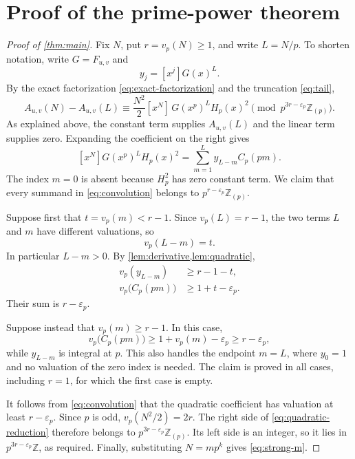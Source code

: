 \documentclass[11pt,a4paper]{article}
\numberwithin{equation}{section}
\theoremstyle{definition}
\theoremstyle{remark}
\newcommand{\Z}{\mathbb Z}
\newcommand{\Zp}{\Z_{(p)}}
\newcommand{\vp}{v_p}
\newcommand{\epsp}{\varepsilon_p}
\newcommand{\Auv}{A_{u,v}}
\newcommand{\Fp}{F_{u,v}}
\newcommand{\Hp}{H_p}
\newcommand{\Cp}{C_p}
\newcommand{\pmodring}[1]{\pmod{#1\Zp}}
\begin{document}
\section{Proof of the prime-power theorem}\label{sec:proof}

\begin{proof}[Proof of \cref{thm:main}]
Fix $N$, put $r=\vp(N)\geq1$, and write $L=N/p$. To shorten notation,
write $G=\Fp$ and
\[
 y_j=[x^j]G(x)^L.
\]
By the exact factorization \eqref{eq:exact-factorization} and the
truncation \eqref{eq:tail},
\begin{equation}\label{eq:quadratic-reduction}
 \Auv(N)-\Auv(L)
 \equiv\frac{N^2}{2}[x^N]\,G(x^p)^L\Hp(x)^2
 \pmodring{p^{3r-\epsp}}.
\end{equation}
As explained above, the constant term supplies $\Auv(L)$ and the linear
term supplies zero. Expanding the coefficient on the right gives
\begin{equation}\label{eq:convolution}
 [x^N]G(x^p)^L\Hp(x)^2
   =\sum_{m=1}^{L}y_{L-m}\Cp(pm).
\end{equation}
The index $m=0$ is absent because $\Hp^2$ has zero constant term.
We claim that every summand in \eqref{eq:convolution} belongs to
$p^{r-\epsp}\Zp$.

Suppose first that $t=\vp(m)<r-1$. Since $\vp(L)=r-1$, the two terms
$L$ and $m$ have different valuations, so
\[
 \vp(L-m)=t.
\]
In particular $L-m>0$. By \cref{lem:derivative,lem:quadratic},
\begin{align}
 \vp(y_{L-m})&\geq r-1-t,\label{eq:first-factor}\\
 \vp\bigl(\Cp(pm)\bigr)&\geq1+t-\epsp.\label{eq:second-factor}
\end{align}
Their sum is $r-\epsp$.

Suppose instead that $\vp(m)\geq r-1$. In this case,
\[
 \vp\bigl(\Cp(pm)\bigr)\geq1+\vp(m)-\epsp\geq r-\epsp,
\]
while $y_{L-m}$ is integral at $p$. This also handles the endpoint
$m=L$, where $y_0=1$ and no valuation of the zero index is needed.
The claim is proved in all cases, including $r=1$, for which the first
case is empty.

It follows from \eqref{eq:convolution} that the quadratic coefficient has
valuation at least $r-\epsp$. Since $p$ is odd,
$\vp(N^2/2)=2r$. The right side of \eqref{eq:quadratic-reduction}
therefore belongs to $p^{3r-\epsp}\Zp$. Its left side is an integer, so
it lies in $p^{3r-\epsp}\Z$, as required. Finally, substituting
$N=mp^k$ gives \eqref{eq:strong-m}.
\end{proof}
\end{document}
